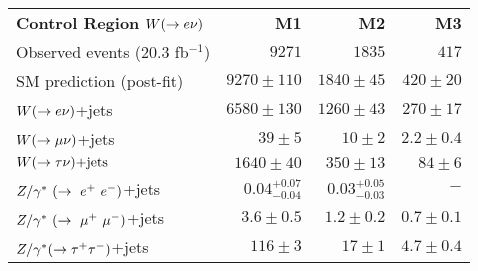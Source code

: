 \begin{table}[!ht]
\begin{center}
\begin{small}
\begin{tabular*}{\textwidth}{@{\extracolsep{\fill}}lrrr}\hline
{\bf Control Region} $W(\rightarrow e \nu)$  & \textbf{M1} & \textbf{M2} & \textbf{M3}  \\
    Observed events  (20.3 fb${}^{-1}$)& $9271$                &  $1835$                       & $417$           \\ \hline
                                                                                                               
    SM prediction (post-fit)&                      $9270 \pm 110$        &  $1840 \pm 45$                & $420 \pm 20$  \\ \hline
                                                                                                               
    $W(\rightarrow e \nu)$+jets &                      $6580 \pm 130$        &  $1260 \pm 43$                & $270 \pm 17$  \\
                                                                                                               
    $W(\rightarrow \mu \nu)$+jets &                      $39 \pm 5$            &  $10 \pm 2$                   & $2.2 \pm 0.4$  \\
                                                                                                               
    $W(\rightarrow \tau \nu)\text{+jets}$        &                      $1640 \pm 40$         &  $350 \pm 13$                 & $84 \pm 6$     \\
                                                                                                               
    $Z/\gamma^*~(\rightarrow~e^+~e^-)$+jets       &                      $0.04_{-0.04}^{+0.07}$&  $0.03_{-0.03}^{+0.05}$       & $-$            \\
                                                                                                               
    $Z/\gamma^*~(\rightarrow~\mu^+~\mu^-)$+jets       &                      $3.6 \pm 0.5$         &  $1.2 \pm 0.2$                & $0.7 \pm 0.1$   \\
                                                                                                               
    $Z/\gamma^*(\rightarrow \tau^+ \tau^-)$+jets        &                      $116 \pm 3$           &  $17 \pm 1$                   & $4.7 \pm 0.4$   \\
                                                                                                               

\end{tabular*}
\end{small}
\end{center}
\end{table}
